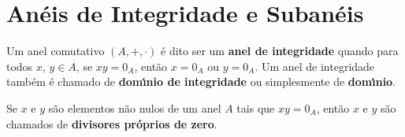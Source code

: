 \section{An\'eis de Integridade e Suban\'eis} %
\label{sec:aneis_de_integridade_e_subaneis}

\begin{definicao}
    Um anel comutativo $(A, + , \cdot)$ {\'e} dito ser um \textbf{anel de integridade} quando para todos $x$, $y \in A$, se $xy = 0_A$, ent{\~a}o $x = 0_A$ ou $y = 0_A$. Um anel
    de integridade tamb{\'e}m {\'e} chamado de \textbf{dom{\'\i}nio de integridade} ou simplesmente de \textbf{dom{\'\i}nio}.
\end{definicao}

\begin{observacao}
    Se $x$ e $y$ s{\~a}o elementos n{\~a}o nulos de um anel $A$ tais que $xy = 0_A$, ent{\~a}o $x$ e $y$ s{\~a}o chamados de \textbf{divisores pr{\'o}prios de zero}.
\end{observacao}


